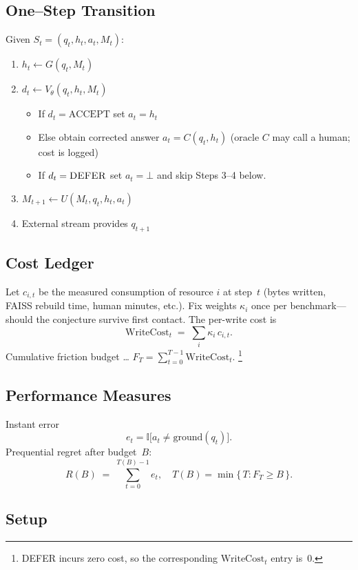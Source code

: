 \documentclass[11pt]{article}
\newcommand{\WriteCost}{\mathrm{WriteCost}}
\begin{document}
\subsection{One--Step Transition}
\label{sec:transition}

Given $S_t=(q_t,h_t,a_t,M_t)$:
\begin{enumerate}
  \item $h_t \leftarrow G(q_t,M_t)$
  \item $d_t \leftarrow V_\theta(q_t,h_t,M_t)$
        \begin{itemize}
          \item If $d_t=\mathrm{ACCEPT}$ set $a_t=h_t$
          \item Else obtain corrected answer $a_t = C(q_t,h_t)$
                (oracle $C$ may call a human; cost is logged)
          \item If $d_t=\textsc{DEFER}$ set $a_t=\bot$
                and skip Steps 3–4 below.
        \end{itemize}
  \item $M_{t+1} \leftarrow U(M_t,q_t,h_t,a_t)$
  \item External stream provides $q_{t+1}$
\end{enumerate}

\subsection{Cost Ledger}
\label{sec:cost-ledger}

Let $c_{i,t}$ be the measured consumption of resource $i$ at step~$t$
(bytes written, FAISS rebuild time, human minutes, etc.).
Fix weights $\kappa_i$ once per benchmark—should the conjecture survive first contact.  The per-write cost is
\[
  \WriteCost_t \;=\; \sum_i \kappa_i\,c_{i,t}.
\]
Cumulative friction budget …  $F_T = \sum_{t=0}^{T-1}\WriteCost_t$.%
\footnote{\textsc{DEFER} incurs zero cost, so the corresponding
$\WriteCost_t$ entry is~0.}

\subsection{Performance Measures}
\label{sec:performance-measures}

Instant error
\[
  e_t = \mathbb{I}\bigl[a_t \neq \text{ground}(q_t)\bigr].
\]
Prequential regret after budget~$B$:
\[
  R(B) \;=\; \sum_{t=0}^{T(B)-1} e_t,
  \quad
  T(B) = \min\{\,T : F_T \ge B\,\}.
\]

\subsection{Setup}\label{sec:setup}
\end{document}
